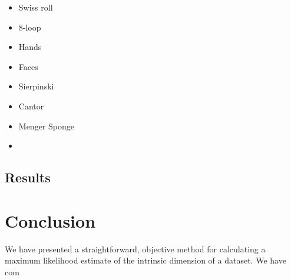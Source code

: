 \documentclass{article}
\theoremstyle{definition}
\begin{document}
\begin{itemize}
  \item Swiss roll
  \item 8-loop
   
  \item Hands
  \item Faces

  \item Sierpinski
  \item Cantor
  \item Menger Sponge
   
  \item 
\end{itemize}

\subsection{Results}

\section{Conclusion}

We have presented a straightforward, objective method for calculating a maximum likelihood estimate of the intrinsic dimension of a dataset. We have com 
\end{document}
